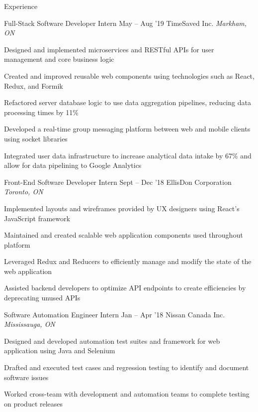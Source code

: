\documentclass{resume} %
\begin{document}
\begin{rSection}{Experience}
  \begin{rWorkSection}
    {Full-Stack Software Developer Intern}
    {\textnormal{May -- Aug '19}}
    {TimeSaved Inc.}
    {\em{Markham, ON}}
    \item Designed and implemented microservices and RESTful APIs for user management and core business logic
    \item Created and improved reusable web components using technologies such as React, Redux, and Formik
    \item Refactored server database logic to use data aggregation pipelines, reducing data processing times by 11{\%} 
    \item Developed a real-time group messaging platform between web and mobile clients using socket libraries
    \item Integrated user data infrastructure to increase analytical data intake by 67{\%} and allow for data pipelining to Google Analytics
  \end{rWorkSection}

    \vspace{-0.1em}

    \begin{rWorkSection}{Front-End Software Developer Intern}
                      {\textnormal{Sept -- Dec '18}}
                      {EllisDon Corporation}
                      {\em{Toronto, ON}}
    \item Implemented layouts and wireframes provided by UX designers using React's JavaScript framework
    \item Maintained and created scalable web application components used throughout platform
    \item Leveraged Redux and Reducers to efficiently manage and modify the state of the web application
    \item Assisted backend developers to optimize API endpoints to create efficiencies by deprecating unused APIs
  \end{rWorkSection}

    \vspace{-0.1em}

  \begin{rWorkSection}{Software Automation Engineer Intern}
                     {\textnormal{Jan -- Apr '18}}
                     {Nissan Canada Inc.}
                     {\em{Mississauga, ON}}
    \item Designed and developed automation test suites and framework for web application using Java and Selenium
    \item Drafted and executed test cases and regression testing to identify and document software issues
    \item Worked cross-team with development and automation teams to complete testing on product releases
  \end{rWorkSection}
  \vspace{-0.1em}
\end{rSection}
\end{document}

